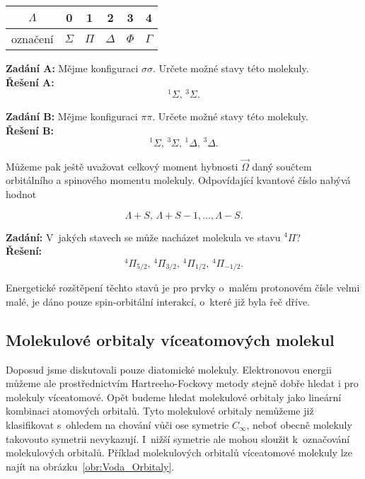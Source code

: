 \begin{table} [H]
\centering
\begin{tabular}{c|c|c|c|c|c}
\toprule
$\Lambda$ & 0 & 1 & 2 & 3 & 4\\
\midrule
označení & $\Sigma$ & $\Pi$ & $\Delta$ & $\Phi$ & $\Gamma$\\
\bottomrule
\end{tabular}
\end{table}

\begin{priklad}
\textbf{Zadání A:} Mějme konfiguraci $\sigma\sigma$. Určete možné stavy této molekuly.\\[0.1cm]
\textbf{Řešení A:} 
\begin{displaymath}
^{1}\Sigma, \, ^{3}\Sigma.
\end{displaymath}

\textbf{Zadání B:} Mějme konfiguraci $\pi\pi$. Určete možné stavy této molekuly.\\[0.1cm]
\textbf{Řešení B:}
\begin{displaymath}
^{1}\Sigma, \, ^{3}\Sigma, \, ^{1}\Delta, \, ^{3}\Delta.
\end{displaymath} \vspace{-0.7cm}
\end{priklad}

Můžeme pak ještě uvažovat celkový moment hybnosti $\vec{\Omega}$ daný součtem orbitálního a spinového momentu molekuly. Odpovídající kvantové číslo nabývá hodnot

\begin{equation}
\Lambda + S, \, \Lambda + S - 1, \dots, \Lambda - S. 
\label{rov:ElStrukt-25}
\end{equation}

\begin{priklad}
\textbf{Zadání:} V~jakých stavech se může nacházet molekula ve stavu $^4\Pi$?\\[0.1cm]
\textbf{Řešení:}
\begin{displaymath}
^4\Pi_{5/2}, \, ^4\Pi_{3/2}, \, ^4\Pi_{1/2}, \, ^4\Pi_{-1/2}.
\end{displaymath} \vspace{-0.7cm}
\end{priklad}

Energetické rozštěpení těchto stavů je pro prvky o~malém protonovém čísle velmi malé, je dáno pouze spin-orbitální interakcí, o~které již byla řeč dříve. 


\subsection{Molekulové orbitaly víceatomových molekul}
Doposud jsme diskutovali pouze diatomické molekuly. Elektronovou energii můžeme ale prostřednictvím Hartreeho-Fockovy metody stejně dobře hledat i pro molekuly víceatomové. Opět budeme hledat molekulové orbitaly jako lineární kombinaci atomových orbitalů. Tyto molekulové orbitaly nemůžeme již klasifikovat s~ohledem na chování vůči ose symetrie $C_\infty$, neboť obecně molekuly takovouto symetrii nevykazují. I~nižší symetrie ale mohou sloužit k~označování molekulových orbitalů. Příklad molekulových orbitalů víceatomové molekuly lze najít na obrázku~\ref{obr:Voda_Orbitaly}.

